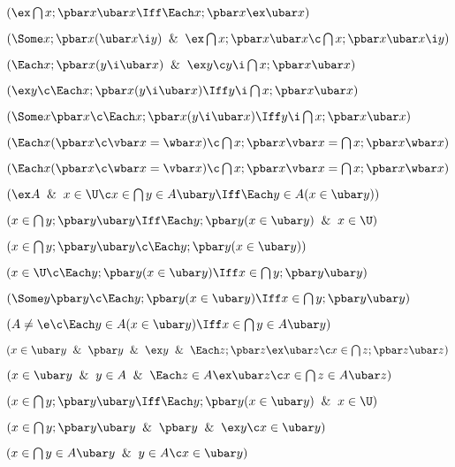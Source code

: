 
 $(\ex \bigcap x; \pbar x \ubar x \Iff
	\Each x; \pbar x \ex \ubar x)$

$(\Some x;\pbar x (\ubar x \i y) \And \ex \bigcap x ;\pbar x \ubar x
	\c \bigcap x;\pbar x \ubar x \i y)$

$(\Each x;\pbar x (y \i \ubar x) \And \ex y
	\c y \i \bigcap x;\pbar x \ubar x )$

 $(\ex y \c \Each x;\pbar x(y \i \ubar x)
	\Iff y \i \bigcap x;\pbar x \ubar x)$

 $(\Some x \pbar x \c \Each x;\pbar x(y \i \ubar x)
	\Iff y \i \bigcap x;\pbar x \ubar x)$

 $(\Each x (\pbar x \c \vbar x = \wbar x )\c 
	\bigcap x ; \pbar x \vbar x = \bigcap x; \pbar x \wbar x)$

 $(\Each x (\pbar x \c \wbar x = \vbar x )\c 
	\bigcap x ; \pbar x \vbar x = \bigcap x; \pbar x \wbar x)$

 $(\ex A \And x \in \U \c x \in 
	\bigcap y \in A\ubar y \Iff \Each y \in A (x \in \ubar y))$

 $(x \in \bigcap y;\pbar y \ubar y \Iff 
	\Each y;\pbar y (x \in \ubar y) \And x \in \U)$

 $(x \in \bigcap y;\pbar y \ubar y \c \Each y;\pbar y(x \in \ubar y))$


 $(x \in \U \c 
	\Each y;\pbar y (x \in \ubar y) \Iff x \in \bigcap y;\pbar y \ubar y )$

 $(\Some y \pbar y \c 
	\Each y;\pbar y (x \in \ubar y) \Iff x \in \bigcap y;\pbar y \ubar y )$

 $(A \ne \e \c 
	\Each y \in A (x \in \ubar y) \Iff x \in \bigcap y \in A \ubar y )$

 $(x \in \ubar y \And \pbar y \And \ex y \And 
	\Each z;\pbar z \ex\ubar z \c x \in \bigcap z;\pbar z \ubar z)$

 $(x \in \ubar y \And y \in A \And \Each z \in A \ex\ubar z
	\c x \in \bigcap z\in A \ubar z)$


 $(x \in \bigcap y;\pbar y \ubar y \Iff
	\Each y;\pbar y(x \in \ubar y) \And x \in \U)$ 

 $(x \in \bigcap y;\pbar y \ubar y \And \pbar y \And \ex y 
	\c x \in \ubar y)$

 $(x \in \bigcap y \in A \ubar y \And y \in A \c x \in \ubar y)$

